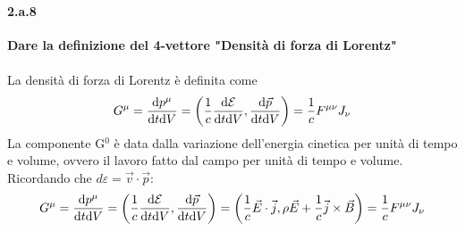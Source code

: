 \documentclass[twoside]{article}
\begin{document}
\paragraph{2.a.8}\textbf{Dare la definizione del 4-vettore "Densità di forza di Lorentz"}\\ \\
La densità di forza di Lorentz è definita come
\begin{equation*}
    \tensor{G}{^{\mu}}=\frac{\text{d}p^{\mu}}{\text{d}t\text{d}V}=\biggl(\frac{1}{c}\frac{\text{d}\mathcal{E}}{\text{d}t\text{d}V},\frac{\text{d}\vec{p}}{\text{d}t\text{d}V}\biggr)=\frac{1}{c}F^{\mu \nu}J_\nu
\end{equation*}
La componente G$^0$ è data dalla variazione dell'energia cinetica per unità di tempo e volume, ovvero il lavoro fatto dal campo per unità di tempo e volume.\\
Ricordando che $d\varepsilon=\vec{v}\cdot\vec{p}$:
\begin{equation*}
    \tensor{G}{^{\mu}}=\frac{\text{d}p^{\mu}}{\text{d}t\text{d}V}=\biggl(\frac{1}{c}\frac{\text{d}\mathcal{E}}{\text{d}t\text{d}V},\frac{\text{d}\vec{p}}{\text{d}t\text{d}V}\biggr)=\biggl(\frac{1}{c}\vec{E}\cdot \vec{j},\rho \vec{E}+\frac{1}{c}\vec{j}\times\vec{B}\biggr)=\frac{1}{c}F^{\mu \nu}J_\nu
\end{equation*}
\end{document}
